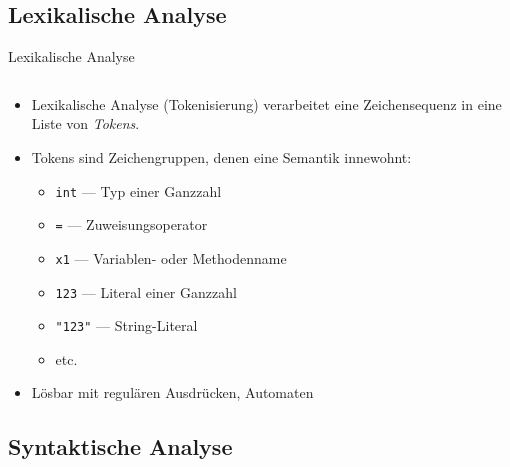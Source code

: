 \documentclass{beamer}
\begin{document}
\subsection{Lexikalische Analyse}

\begin{frame}{Lexikalische Analyse}
	\begin{columns}
		\begin{column}{0.5\textwidth}
		\end{column}
		\begin{column}{0.5\textwidth}
		\end{column}
	\end{columns}

	\begin{itemize}
		\item Lexikalische Analyse (Tokenisierung) verarbeitet eine Zeichensequenz in eine Liste von \emph{Tokens}.
		\item Tokens sind Zeichengruppen, denen eine Semantik innewohnt:
		\begin{itemize}
			\item \texttt{int} --- Typ einer Ganzzahl
			\item \texttt{=} --- Zuweisungsoperator
			\item \texttt{x1} --- Variablen- oder Methodenname
			\item \texttt{123} --- Literal einer Ganzzahl
			\item \texttt{"123"} --- String-Literal
			\item etc.
		\end{itemize}
		\item Lösbar mit regulären Ausdrücken, Automaten
	\end{itemize}
\end{frame}

\subsection{Syntaktische Analyse}
\end{document}

